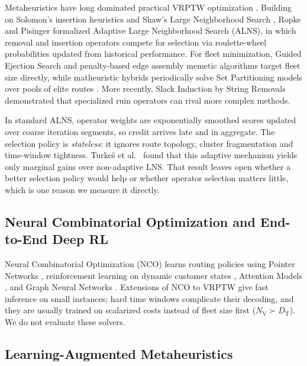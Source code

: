 \documentclass{ieeeaccess}
\newcommand{\NV}{{N_\mathrm{V}}}
\newcommand{\TD}{{D_\mathrm{T}}}
\begin{document}
Metaheuristics have long dominated practical VRPTW optimization \cite{braysy2005vehicle}. Building on Solomon's insertion heuristics \cite{Solomon1987} and Shaw's Large Neighborhood Search \cite{shaw1998using}, Ropke and Pisinger \cite{Ropke2006, pisinger2007general, pisinger2010large} formalized Adaptive Large Neighborhood Search (ALNS), in which removal and insertion operators compete for selection via roulette-wheel probabilities updated from historical performance. For fleet minimization, Guided Ejection Search \cite{nagata2009ges} and penalty-based edge assembly memetic algorithms \cite{nagata2010srex} target fleet size directly, while matheuristic hybrids periodically solve Set Partitioning models over pools of elite routes \cite{rochat1995probabilistic, alvarenga2007genetic, subramanian2013hybrid}. More recently, Slack Induction by String Removals \cite{christiaens2020slack} demonstrated that specialized ruin operators can rival more complex methods.

In standard ALNS, operator weights are exponentially smoothed scores updated over coarse iteration segments, so credit arrives late and in aggregate. The selection policy is \emph{stateless}: it ignores route topology, cluster fragmentation and time-window tightness. Turke\v{s} et al.\ \cite{turkes2021meta} found that this adaptive mechanism yields only marginal gains over non-adaptive LNS. That result leaves open whether a better selection policy would help or whether operator selection matters little, which is one reason we measure it directly.

\subsection{Neural Combinatorial Optimization and End-to-End Deep RL}
\label{sec:rw_nco}

Neural Combinatorial Optimization (NCO) learns routing policies using Pointer Networks \cite{vinyals2015pointer, bello2016neural}, reinforcement learning on dynamic customer states \cite{nazari2018reinforcement}, Attention Models \cite{kool2019attention}, and Graph Neural Networks \cite{khalil2017learning, joshi2019efficient}. Extensions of NCO to VRPTW \cite{falkner2020learning, lin2021deep} give fast inference on small instances; hard time windows complicate their decoding, and they are usually trained on scalarized costs instead of fleet size first ($\NV \succ \TD$). We do not evaluate these solvers.

\subsection{Learning-Augmented Metaheuristics}
\label{sec:rw_hybrid}
\end{document}
